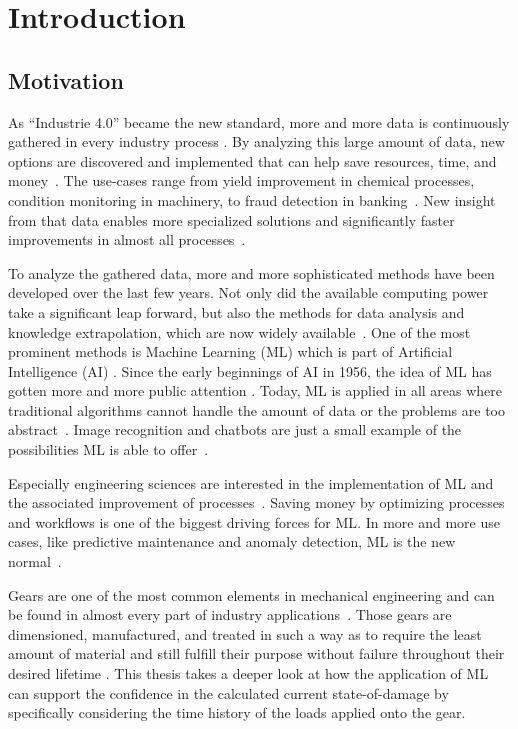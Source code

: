 \chapter{Introduction}
\section{Motivation}\label{intro}
As “Industrie 4.0” became the new standard, more and more data is continuously gathered in every industry process \cite{Vogel}. By analyzing this large amount of data, new options are discovered and implemented that can help save resources, time, and money~\cite{Theodoridis}. The use-cases range from yield improvement in chemical processes, condition monitoring in machinery, to fraud detection in banking~\cite{Janiesch}. New insight from that data enables more specialized solutions and significantly faster improvements in almost all processes~\cite{Russell}. 

To analyze the gathered data, more and more sophisticated methods have been developed over the last few years. Not only did the available computing power take a significant leap forward, but also the methods for data analysis and knowledge extrapolation, which are now widely available~\cite{Janiesch}. One of the most prominent methods is Machine Learning (ML) which is part of Artificial Intelligence (AI) \cite{Helm}. Since the early beginnings of AI in 1956, the idea of ML has gotten more and more public attention \cite{Russell}. Today, ML is applied in all areas where traditional algorithms cannot handle the amount of data or the problems are too abstract~\cite{Carleo}. Image recognition and chatbots are just a small example of the possibilities ML is able to offer~\cite{Theodoridis}.

Especially engineering sciences are interested in the implementation of ML and the associated improvement of processes~\cite{Carleo}. Saving money by optimizing processes and workflows is one of the biggest driving forces for ML. In more and more use cases, like predictive maintenance and anomaly detection, ML is the new normal~\cite{Theodoridis}.

Gears are one of the most common elements in mechanical engineering and can be found in almost every part of industry applications~\cite{Vullo}. Those gears are dimensioned, manufactured, and treated in such a way as to require the least amount of material and still fulfill their purpose without failure throughout their desired lifetime \cite{Bugliarello}. This thesis takes a deeper look at how the application of ML can support the confidence in the calculated current state-of-damage by specifically considering the time history of the loads applied onto the gear.
